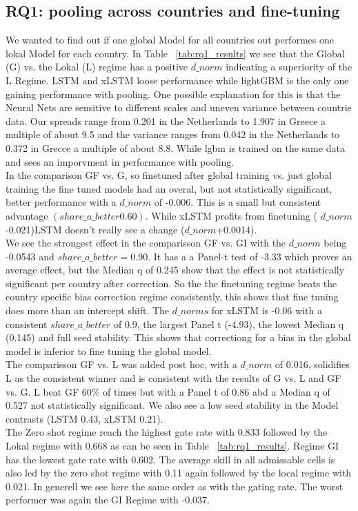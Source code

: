 \subsection{RQ1: pooling across countries and fine-tuning}
\label{sec:res:rq1}
We wanted to find out if one global Model for all countries out performes one lokal Model for each country. In Table ~\ref{tab:rq1_results} we see that the Global (G) vs. the Lokal (L) regime has a positive $d\_norm$ indicating a superiority of the L Regime. LSTM and xLSTM loose performance while lightGBM is the only one gaining performance with pooling. One possible explanation for this is that the Neural Nets are sensitive to different scales and uneven variance between countrie data. Our spreads range from 0.201 in the Netherlands to 1.907 in Greece a multiple of about 9.5 and the variance ranges from 0.042 in the Netherlands to 0.372 in Grecce a multiple of about 8.8. While lgbm is trained on the same data and sees an imporvment in performance with pooling.  \\
In the comparison GF vs. G, so finetuned after global training vs. just global training the fine tuned models had an overal, but not statistically significant, better performance with a $d\_norm$ of -0.006. This is a small but consistent advantage $(share\_a\_better 0.60)$. While xLSTM profits from finetuning ( $d\_norm$ -0.021)LSTM doesn't really see a change ($d\_norm$+0.0014). \\
We see the strongest effect in the comparisson GF vs. GI with the $d\_norm$ being -0.0543 and $share\_a\_better=0.90$. It has a a Panel-t test of -3.33 which proves an average effect, but the Median q of 0.245 show that the effect is not statistically significant per country after correction. So the the finetuning regime beats the country specific bias correction regime consistently, this shows that fine tuning does more than an intercept shift. The $d\_norms$ for xLSTM is -0.06 with a consistent $share\_a\_better$ of 0.9, the largest Panel t (-4.93), the lowest Median q (0.145) and full seed stability. This shows that correctiong for a bias in the global model is inferior to fine tuning the global model. \\
The comparisson GF vs. L was added post hoc, with a $d\_norm$ of 0.016, solidifies L as the consistent winner and is consistent with the results of G vs. L and GF vs. G. L beat GF $60\%$ of times but with a Panel t of 0.86 abd a Median q of 0.527 not statistically significant. We also see a low seed stability in the Model contrasts (LSTM 0.43, xLSTM 0.21).\\
The Zero shot regime reach the highest gate rate with 0.833 followed by the Lokal regime with 0.668 as can be seen in Table ~\ref{tab:rq1_results}. Regime GI has the lowest gate rate with 0.602. The average skill in all admissable cells is also led by the zero shot regime with 0.11 again followed by the local regime with 0.021. In generell we see here the same order as with the gating rate. The worst performer was again the GI Regime with -0.037.\\



